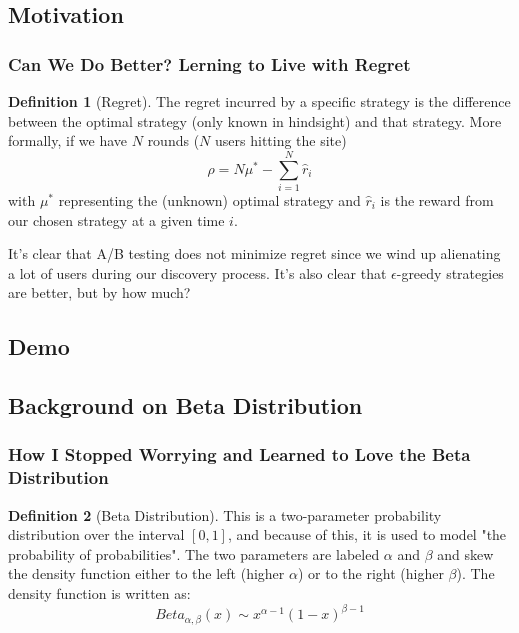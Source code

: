 \documentclass[]{beamer}
\theoremstyle{definition}
\newtheorem{defn}{Definition}[section]
\begin{document}
\subsection{Motivation}
\begin{frame}
\frametitle{Can We Do Better?  Lerning to Live with Regret}
\begin{defn}[Regret]
The regret incurred by a specific strategy is the difference between the optimal strategy (only known in hindsight) and that strategy.  More formally, if we have $N$ rounds ($N$ users hitting the site)
$$
\rho = N\mu^{*} - \sum_{i=1}^N\hat{r}_i
$$
with $\mu^*$ representing the (unknown) optimal strategy and $\hat{r}_i$ is the reward from our chosen strategy at a given time $i$.
\end{defn}
It's clear that A/B testing does not minimize regret since we wind up alienating a lot of users during our discovery process.  It's also clear that $\epsilon$-greedy strategies are better, but by how much?
\end{frame}
\subsection{Demo}


\subsection{Background on Beta Distribution}
\begin{frame}
\frametitle{How I Stopped Worrying and Learned to Love the Beta Distribution}
\begin{defn}[Beta Distribution]
This is a two-parameter probability distribution over the interval $[0, 1]$, and because of this, it is used to model "the probability of probabilities".  The two parameters are labeled $\alpha$ and $\beta$ and skew the density function either to the left (higher $\alpha$) or to the right (higher $\beta$).  The density function is written as:
$$
Beta_{\alpha, \beta}(x) \sim x^{\alpha - 1}(1 - x)^{\beta - 1}
$$
\end{defn}\pause
\end{frame}
\end{document}

